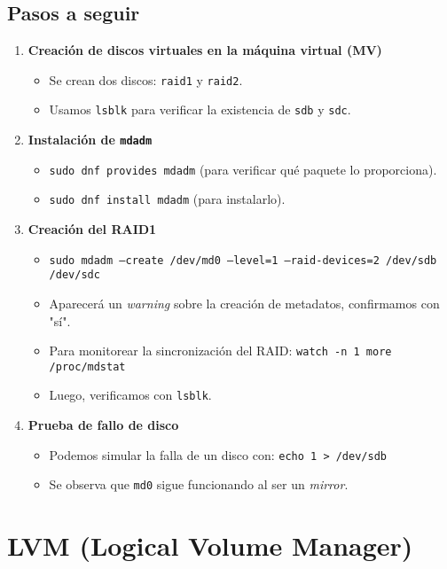 \subsection{Pasos a seguir}
\begin{enumerate}
    \item \textbf{Creación de discos virtuales en la máquina virtual (MV)}
    \begin{itemize}
        \item Se crean dos discos: \texttt{raid1} y \texttt{raid2}.
        \item Usamos \texttt{lsblk} para verificar la existencia de \texttt{sdb} y \texttt{sdc}.
    \end{itemize}

    \item \textbf{Instalación de \texttt{mdadm}}
    \begin{itemize}
        \item \texttt{sudo dnf provides mdadm} (para verificar qué paquete lo proporciona).
        \item \texttt{sudo dnf install mdadm} (para instalarlo).
    \end{itemize}

    \item \textbf{Creación del RAID1}
    \begin{itemize}
        \item \texttt{sudo mdadm --create /dev/md0 --level=1 --raid-devices=2 /dev/sdb /dev/sdc}
        \item Aparecerá un \textit{warning} sobre la creación de metadatos, confirmamos con "sí".
        \item Para monitorear la sincronización del RAID:  
              \texttt{watch -n 1 more /proc/mdstat}
        \item Luego, verificamos con \texttt{lsblk}.
    \end{itemize}

    \item \textbf{Prueba de fallo de disco}
    \begin{itemize}
        \item Podemos simular la falla de un disco con:  
              \texttt{echo 1 > /dev/sdb}
        \item Se observa que \texttt{md0} sigue funcionando al ser un \textit{mirror}.
    \end{itemize}
\end{enumerate}

\section{LVM (Logical Volume Manager)}

